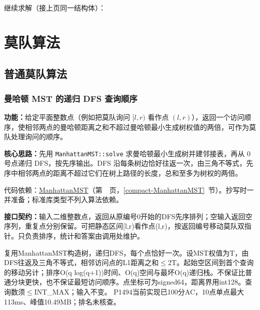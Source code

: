 \newpage

\noindent 继续求解（接上页同一结构体）：



\newpage

\Needspace{550pt}

\section{莫队算法}

\subsection{普通莫队算法}

\subsubsection{曼哈顿 MST 的递归 DFS 查询顺序}\label{compact-manhattan_order}

\noindent\textbf{功能：}\allowbreak 给定平面整数点（例如把莫队询问 $[l,r)$ 看作点 $(l,r)$），返回一个访问顺序，使相邻两点的曼哈顿距离之和不超过曼哈顿最小生成树权值的两倍，可作为莫队处理询问的顺序。

\textbf{核心思路：}\allowbreak 先用 \texttt{ManhattanMST::solve} 求曼哈顿最小生成树并建邻接表，再从 0 号点递归 DFS，按先序输出。DFS 沿每条树边恰好往返一次，由三角不等式，先序中相邻两点的距离不超过它们在树上路径的长度，总和至多为树权的两倍。

代码依赖：\hyperref[compact-ManhattanMST]{ManhattanMST}（第~\pageref{compact-ManhattanMST}~页，\ref{compact-ManhattanMST}~节）。抄写时一并准备；标准库类型不列入算法依赖。

{\sloppy{}\noindent\textbf{接口契约：}输入二维整数点，返回从原编号0开始的DFS先序排列；空输入返回空序列，重复点分别保留。可把静态区间[l,r)看作点(l,r)，按返回编号移动莫队双指针。只负责排序，统计和答案由调用处维护。

复用ManhattanMST构造树，递归DFS，每个点恰好一次。设MST权值为T，由DFS往返及三角不等式，相邻访问点的L1距离之和$\le$2T。起始空区间到首个查询的移动另计；排序O(q log(q+1))时间、O(q)空间与最坏O(q)递归栈。不保证比普通分块更快，也不保证最短访问顺序。点坐标可为signed64，距离界用int128。查询数须$\le$INT\_MAX；输入不变。 P1494当前实现已100分AC，10点单点最大113ms、峰值10.49MB；排名未核查。\par}



